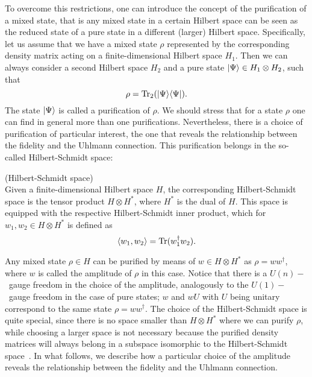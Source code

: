 To overcome this restrictions, one can introduce the concept of the purification of a mixed state, that is any mixed state in a certain Hilbert space can be seen as the reduced state of a pure state in a different (larger) Hilbert space. Specifically, let us assume that we have a mixed state $\rho$ represented by the corresponding density matrix acting on a finite-dimensional Hilbert space $H_1$. Then we can always consider a second Hilbert space $H_2$ and a pure state $| \Psi \rangle\in H_1\otimes H_2$, such that $$\rho=\text{Tr}_2 (| \Psi \rangle\langle \Psi |).$$ The state $| \Psi \rangle$ is called a purification of $\rho$. We should stress that for a state $\rho$ one can find in general more than one purifications. Nevertheless, there is a choice of purification of particular interest, the one that reveals the relationship between the fidelity and the Uhlmann connection. This purification belongs in the so-called Hilbert-Schmidt space: 
 \begin{definition}
 	(Hilbert-Schmidt space)\\Given a finite-dimensional Hilbert space $H$, the corresponding Hilbert-Schmidt space is the tensor product $H\otimes H^*$, where $H^*$ is the dual of $H$. This space is equipped with the respective Hilbert-Schmidt inner product, which for $w_1,w_2\in H\otimes H^*$ is defined as
 	$$\langle w_1,w_2\rangle= \text{Tr} (w_1^{\dagger}w_2).$$ 
 \end{definition}  
Any mixed state $\rho\in H$ can be purified by means of $w\in H\otimes H^*$ as $\rho=ww^\dagger$, where $w$ is called the amplitude of $\rho$ in this case. Notice that there is a $U(n)-$~gauge freedom in the choice of the amplitude, analogously to the $U(1)-$~gauge freedom in the case of pure states; $w$ and $wU$ with $U$ being unitary correspond to the same state $\rho=ww^\dagger$. The choice of the Hilbert-Schmidt space is quite special, since there is no space smaller than $H\otimes H^*$ where we can purify $\rho$, while choosing a larger space is not necessary because the purified density matrices will always belong in a subspace isomorphic to the Hilbert-Schmidt space~\cite{ben:zyc:06}. In what follows, we describe how a particular choice of the amplitude reveals the relationship between the fidelity and the Uhlmann connection.

